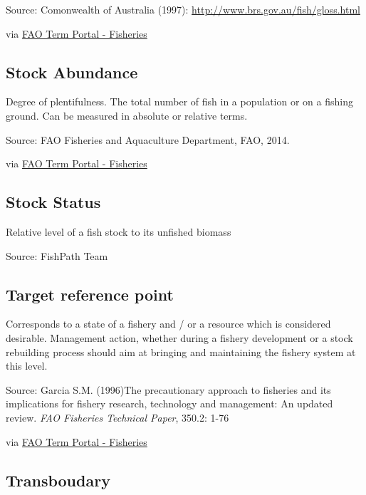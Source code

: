 \documentclass[
  11pt,
]{book}
\begin{document}
Source: Comonwealth of Australia (1997): \url{http://www.brs.gov.au/fish/gloss.html}

via \href{http://www.fao.org/fishery/glossary/en}{FAO Term Portal - Fisheries}

\hypertarget{stock-abundance}{%
\subsection{Stock Abundance}\label{stock-abundance}}

Degree of plentifulness. The total number of fish in a population or on a fishing ground. Can be measured in absolute or relative terms.

Source: FAO Fisheries and Aquaculture Department, FAO, 2014.

via \href{http://www.fao.org/fishery/glossary/en}{FAO Term Portal - Fisheries}

\hypertarget{stock-status}{%
\subsection{Stock Status}\label{stock-status}}

Relative level of a fish stock to its unfished biomass

Source: FishPath Team

\hypertarget{target-reference-point}{%
\subsection{Target reference point}\label{target-reference-point}}

Corresponds to a state of a fishery and / or a resource which is considered desirable. Management action, whether during a fishery development or a stock rebuilding process should aim at bringing and maintaining the fishery system at this level.

Source: Garcia S.M. (1996)The precautionary approach to fisheries and its implications for fishery research, technology and management: An updated review. \emph{FAO Fisheries Technical Paper}, 350.2: 1-76

via \href{http://www.fao.org/fishery/glossary/en}{FAO Term Portal - Fisheries}

\hypertarget{transboudary}{%
\subsection{Transboudary}\label{transboudary}}
\end{document}
